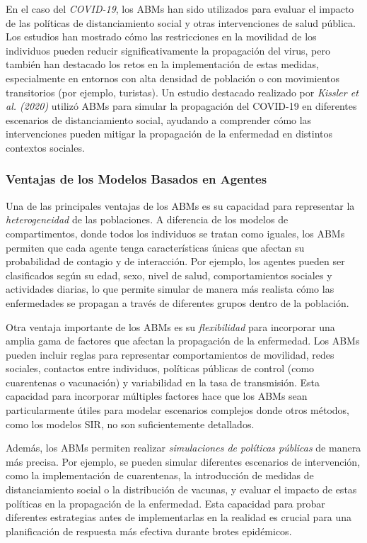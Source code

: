 En el caso del \textit{COVID-19}, los ABMs han sido utilizados para evaluar el impacto de las políticas de distanciamiento social y otras intervenciones de salud pública. Los estudios han mostrado cómo las restricciones en la movilidad de los individuos pueden reducir significativamente la propagación del virus, pero también han destacado los retos en la implementación de estas medidas, especialmente en entornos con alta densidad de población o con movimientos transitorios (por ejemplo, turistas). Un estudio destacado realizado por \textit{Kissler et al. (2020)} utilizó ABMs para simular la propagación del COVID-19 en diferentes escenarios de distanciamiento social, ayudando a comprender cómo las intervenciones pueden mitigar la propagación de la enfermedad en distintos contextos sociales.

\subsubsection{Ventajas de los Modelos Basados en Agentes}

Una de las principales ventajas de los ABMs es su capacidad para representar la \textit{heterogeneidad} de las poblaciones. A diferencia de los modelos de compartimentos, donde todos los individuos se tratan como iguales, los ABMs permiten que cada agente tenga características únicas que afectan su probabilidad de contagio y de interacción. Por ejemplo, los agentes pueden ser clasificados según su edad, sexo, nivel de salud, comportamientos sociales y actividades diarias, lo que permite simular de manera más realista cómo las enfermedades se propagan a través de diferentes grupos dentro de la población.

Otra ventaja importante de los ABMs es su \textit{flexibilidad} para incorporar una amplia gama de factores que afectan la propagación de la enfermedad. Los ABMs pueden incluir reglas para representar comportamientos de movilidad, redes sociales, contactos entre individuos, políticas públicas de control (como cuarentenas o vacunación) y variabilidad en la tasa de transmisión. Esta capacidad para incorporar múltiples factores hace que los ABMs sean particularmente útiles para modelar escenarios complejos donde otros métodos, como los modelos SIR, no son suficientemente detallados.

Además, los ABMs permiten realizar \textit{simulaciones de políticas públicas} de manera más precisa. Por ejemplo, se pueden simular diferentes escenarios de intervención, como la implementación de cuarentenas, la introducción de medidas de distanciamiento social o la distribución de vacunas, y evaluar el impacto de estas políticas en la propagación de la enfermedad. Esta capacidad para probar diferentes estrategias antes de implementarlas en la realidad es crucial para una planificación de respuesta más efectiva durante brotes epidémicos.

